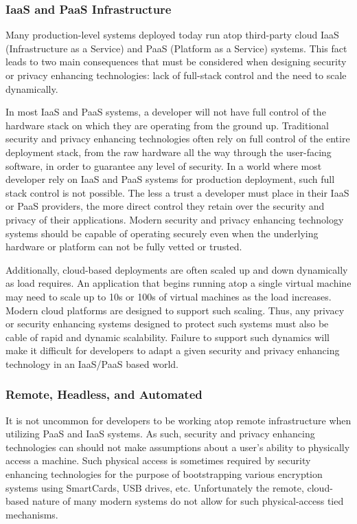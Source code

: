 \subsubsection{IaaS and PaaS Infrastructure}

Many production-level systems deployed today run atop third-party
cloud IaaS (Infrastructure as a Service) and PaaS (Platform as a
Service) systems. This fact leads to two main consequences that must
be considered when designing security or privacy enhancing
technologies: lack of full-stack control and the need to scale
dynamically.

In most IaaS and PaaS systems, a developer will not have full control
of the hardware stack on which they are operating from the ground
up. Traditional security and privacy enhancing technologies often rely
on full control of the entire deployment stack, from the raw hardware
all the way through the user-facing software, in order to guarantee
any level of security. In a world where most developer rely on IaaS
and PaaS systems for production deployment, such full stack control is
not possible. The less a trust a developer must place in their IaaS or
PaaS providers, the more direct control they retain over the security
and privacy of their applications. Modern security and privacy
enhancing technology systems should be capable of operating securely
even when the underlying hardware or platform can not be fully vetted
or trusted.

Additionally, cloud-based deployments are often scaled up and down
dynamically as load requires. An application that begins running atop
a single virtual machine may need to scale up to 10s or 100s of
virtual machines as the load increases. Modern cloud platforms are
designed to support such scaling. Thus, any privacy or security
enhancing systems designed to protect such systems must also be cable
of rapid and dynamic scalability. Failure to support such dynamics
will make it difficult for developers to adapt a given security and
privacy enhancing technology in an IaaS/PaaS based world.

\subsubsection{Remote, Headless, and Automated}

It is not uncommon for developers to be working atop remote
infrastructure when utilizing PaaS and IaaS systems. As such, security
and privacy enhancing technologies can should not make assumptions
about a user's ability to physically access a machine. Such physical
access is sometimes required by security enhancing technologies for
the purpose of bootstrapping various encryption systems using
SmartCards, USB drives, etc. Unfortunately the remote, cloud-based
nature of many modern systems do not allow for such physical-access
tied mechanisms.


